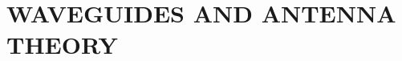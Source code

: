 \documentclass[a4paper,10pt, two column]{book}
\begin{document}
\part{WAVEGUIDES AND ANTENNA THEORY}
































\backmatter
\printindex

\shipoutAnswer
\end{document}
